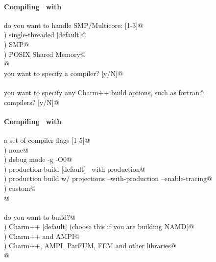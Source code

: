 \begin{frame}[fragile] 
\secframetitle{\ssInstallCharm}
\framesubtitle{Compiling \charm\ with }
\color{black}
\footnotesize

\verb@How do you want to handle SMP/Multicore: [1-3]@ \\
) single-threaded [default]@ \\
) SMP@ \\
) POSIX Shared Memory@ \\
\verb@  @
\pause
\ \\
\verb@Do you want to specify a compiler? [y/N]@\pause\verb@n@ \\
\ \\
\verb@Do you want to specify any Charm++ build options, such as fortran@ \\
\verb@   compilers? [y/N]@ \\

\end{frame}


\begin{frame}[fragile] 
\secframetitle{\ssInstallCharm}
\framesubtitle{Compiling \charm\ with }
\color{black}
\footnotesize

\verb@Choose a set of compiler flags [1-5]@ \\
) none@ \\
) debug mode                      -g -O0@ \\
) production build [default]      --with-production@ \\
) production build w/ projections --with-production --enable-tracing@ \\
) custom@ \\
\verb@  @
\pause
\ \\ \ \\
\verb@What do you want to build?@ \\
) Charm++ [default] (choose this if you are building NAMD)@ \\
) Charm++ and AMPI@ \\
) Charm++, AMPI, ParFUM, FEM and other libraries@ \\
\verb@  @
\end{frame}


